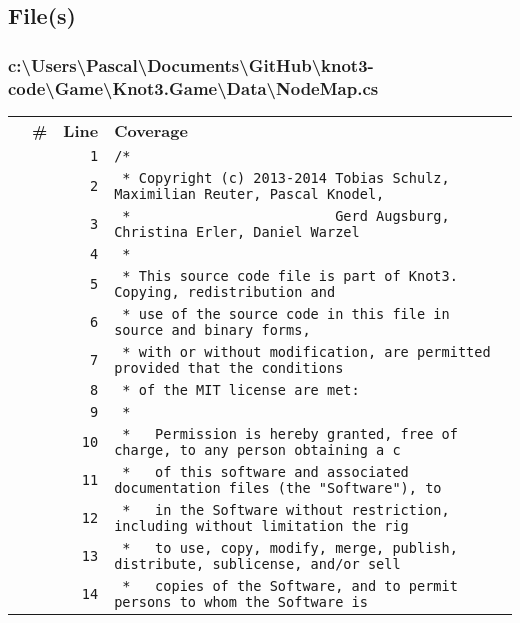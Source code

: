 \documentclass[a4paper,10pt]{article}
\begin{document}
\subsection{File(s)}
\subsubsection{c:\textbackslash Users\textbackslash Pascal\textbackslash Documents\textbackslash GitHub\textbackslash knot3-code\textbackslash Game\textbackslash Knot3.Game\textbackslash Data\textbackslash NodeMap.cs}
\begin{longtable}[l]{lrrl}
\textbf{} & \textbf{\#} & \textbf{Line} & \textbf{Coverage}\\
\cellcolor{gray} &  & \verb~1~ & \verb~/*~\\
\cellcolor{gray} &  & \verb~2~ & \verb~ * Copyright (c) 2013-2014 Tobias Schulz, Maximilian Reuter, Pascal Knodel,~\\
\cellcolor{gray} &  & \verb~3~ & \verb~ *                         Gerd Augsburg, Christina Erler, Daniel Warzel~\\
\cellcolor{gray} &  & \verb~4~ & \verb~ *~\\
\cellcolor{gray} &  & \verb~5~ & \verb~ * This source code file is part of Knot3. Copying, redistribution and~\\
\cellcolor{gray} &  & \verb~6~ & \verb~ * use of the source code in this file in source and binary forms,~\\
\cellcolor{gray} &  & \verb~7~ & \verb~ * with or without modification, are permitted provided that the conditions~\\
\cellcolor{gray} &  & \verb~8~ & \verb~ * of the MIT license are met:~\\
\cellcolor{gray} &  & \verb~9~ & \verb~ *~\\
\cellcolor{gray} &  & \verb~10~ & \verb~ *   Permission is hereby granted, free of charge, to any person obtaining a c~\\
\cellcolor{gray} &  & \verb~11~ & \verb~ *   of this software and associated documentation files (the "Software"), to ~\\
\cellcolor{gray} &  & \verb~12~ & \verb~ *   in the Software without restriction, including without limitation the rig~\\
\cellcolor{gray} &  & \verb~13~ & \verb~ *   to use, copy, modify, merge, publish, distribute, sublicense, and/or sell~\\
\cellcolor{gray} &  & \verb~14~ & \verb~ *   copies of the Software, and to permit persons to whom the Software is~\\

\end{longtable}
\end{document}
